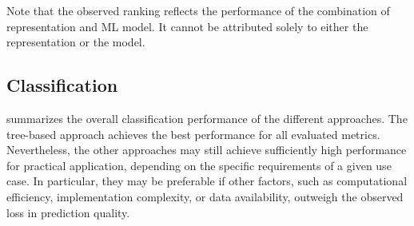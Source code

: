 \documentclass[5p,times,procedia]{elsarticle}
\begin{document}
Note that the observed ranking reflects the performance of the combination of representation and ML model.
It cannot be attributed solely to either the representation or the model.

\subsection{Classification}\label{sec:results-classification}


 summarizes the overall classification performance of the different approaches. The \mbox{tree-based} approach achieves the best performance for all evaluated metrics. Nevertheless, the other approaches may still achieve sufficiently high performance for practical application, depending on the specific requirements of a given use case.
In particular, they may be preferable if other factors, such as computational efficiency, implementation complexity, or data availability, outweigh the observed loss in prediction quality.
\end{document}
